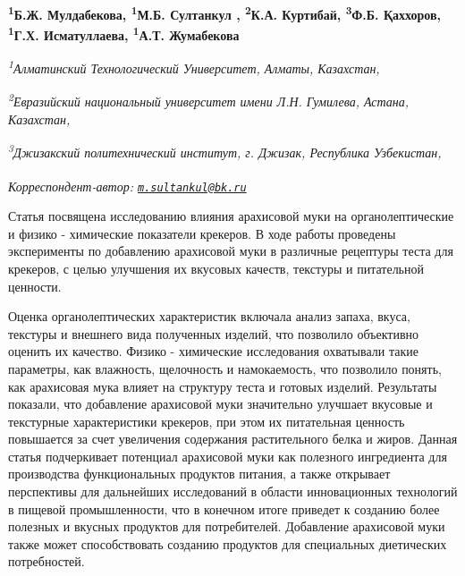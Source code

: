 
\begin{articleheader}

{\bfseries  
\textsuperscript{1}Б.Ж. Мулдабекова,
\textsuperscript{1}М.Б. Султанкул\textsuperscript{\envelope } ,
\textsuperscript{2}К.А. Куртибай,
\textsuperscript{3}Ф.Б. Қаххоров, 
\textsuperscript{1}Г.Х. Исматуллаева,
\textsuperscript{1}А.Т. Жумабекова}
\end{articleheader}

\begin{affiliation}
\emph{\textsuperscript{1}Алматинский Технологический Университет, Алматы, Казахстан,}

\emph{\textsuperscript{2}Евразийский национальный университет имени Л.Н. Гумилева, Астана, Казахстан,}

\emph{\textsuperscript{3}Джизакский политехнический институт, г. Джизак, Республика Узбекистан,}

\raggedright \textsuperscript{\envelope }{\em Корреспондент-автор: \href{mailto:m.sultankul@bk.ru}{\nolinkurl{m.sultankul@bk.ru}}}
\end{affiliation}

Статья посвящена исследованию влияния арахисовой муки на
органолептические и физико - химические показатели крекеров. В ходе работы
проведены эксперименты по добавлению арахисовой муки в различные
рецептуры теста для крекеров, с целью улучшения их вкусовых качеств,
текстуры и питательной ценности.

Оценка органолептических характеристик включала анализ запаха, вкуса,
текстуры и внешнего вида полученных изделий, что позволило объективно
оценить их качество. Физико - химические исследования охватывали такие
параметры, как влажность, щелочность и намокаемость, что позволило
понять, как арахисовая мука влияет на структуру теста и готовых изделий.
Результаты показали, что добавление арахисовой муки значительно улучшает
вкусовые и текстурные характеристики крекеров, при этом их питательная
ценность повышается за счет увеличения содержания растительного белка и
жиров. Данная статья подчеркивает потенциал арахисовой муки как
полезного ингредиента для производства функциональных продуктов питания,
а также открывает перспективы для дальнейших исследований в области
инновационных технологий в пищевой промышленности, что в конечном итоге
приведет к созданию более полезных и вкусных продуктов для потребителей.
Добавление арахисовой муки также может способствовать созданию продуктов
для специальных диетических потребностей.

